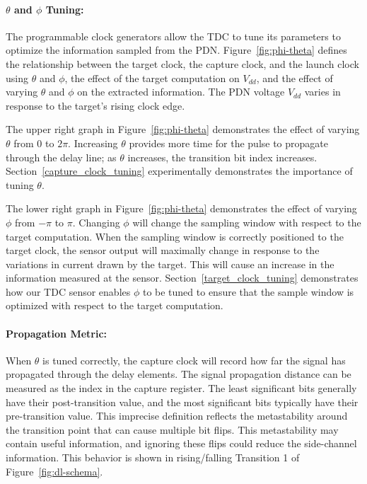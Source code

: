 \paragraph{$\theta$ and $\phi$ Tuning: }
The programmable clock generators allow the \name TDC to tune its parameters to optimize the information sampled from the PDN.
Figure~\ref{fig:phi-theta} defines the relationship between the target clock, the capture clock, and the launch clock using $\theta$ and $\phi$, the effect of the target computation on $V_{dd}$, and the effect of varying $\theta$ and $\phi$ on the extracted information.
The PDN voltage $V_{dd}$ varies in response to the target's rising clock edge.

The upper right graph in Figure~\ref{fig:phi-theta} demonstrates the effect of varying $\theta$ from $0$ to $2\pi$. Increasing $\theta$ provides more time for the pulse to propagate through the delay line; as $\theta$ increases, the transition bit index increases. Section~\ref{capture_clock_tuning} experimentally demonstrates the importance of tuning $\theta$.

The lower right graph in Figure~\ref{fig:phi-theta} demonstrates the effect of varying $\phi$ from $-\pi$ to $\pi$. Changing $\phi$ will change the sampling window with respect to the target computation. When the sampling window is correctly positioned to the target clock, the sensor output will maximally change in response to the variations in current drawn by the target. This will cause an increase in the information measured at the sensor. Section~\ref{target_clock_tuning} demonstrates how our TDC sensor enables $\phi$ to be tuned to ensure that the sample window is optimized with respect to the target computation.

\paragraph{Propagation Metric: }
\label{propagation_metric}
When $\theta$ is tuned correctly, the capture clock will record how far the signal has propagated through the delay elements. The signal propagation distance can be measured as the index in the capture register. The least significant bits generally have their post-transition value, and the most significant bits typically have their pre-transition value.
This imprecise definition reflects the metastability around the transition point that can cause multiple bit flips. This metastability may contain useful information, and ignoring these flips could reduce the side-channel information. This behavior is shown in rising/falling Transition 1 of Figure~\ref{fig:dl-schema}.

